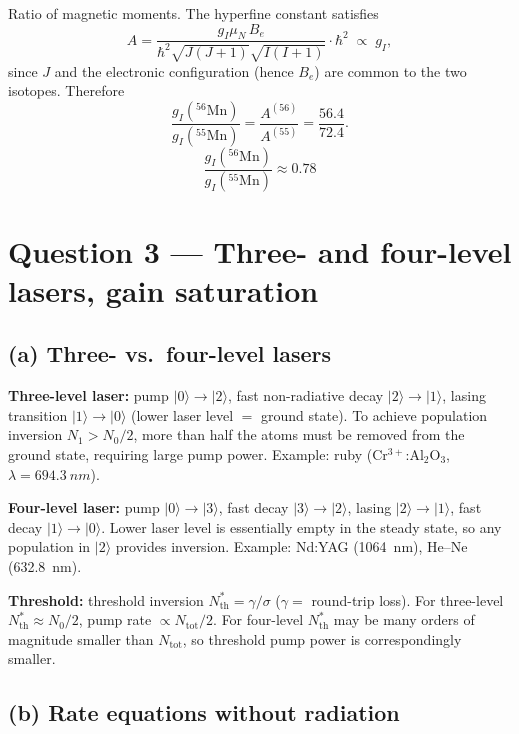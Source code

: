 \documentclass[11pt]{article}
\begin{document}
Ratio of magnetic moments. The hyperfine constant satisfies
\[
A=\frac{g_{I}\mu_{N}\,B_{e}}{\hbar^{2}\sqrt{J(J+1)}\sqrt{I(I+1)}}\cdot\hbar^{2}\;\propto\;g_{I},
\]
since $J$ and the electronic configuration (hence $B_{e}$) are common to the two isotopes. Therefore
\[
\frac{g_{I}({}^{56}\mathrm{Mn})}{g_{I}({}^{55}\mathrm{Mn})}=\frac{A^{(56)}}{A^{(55)}}=\frac{56.4}{72.4}.
\]
\[
\boxed{\;\frac{g_{I}({}^{56}\mathrm{Mn})}{g_{I}({}^{55}\mathrm{Mn})}\approx 0.78\;}
\]

\section*{Question 3 --- Three- and four-level lasers, gain saturation}

\subsection*{(a) Three- vs.\ four-level lasers}

\textbf{Three-level laser:} pump $|0\rangle\!\to\!|2\rangle$, fast non-radiative decay $|2\rangle\!\to\!|1\rangle$, lasing transition $|1\rangle\!\to\!|0\rangle$ (lower laser level $=$ ground state). To achieve population inversion $N_{1}>N_{0}/2$, more than half the atoms must be removed from the ground state, requiring large pump power. Example: ruby (Cr$^{3+}$:Al$_{2}$O$_{3}$, $\lambda=\SI{694.3}{nm}$).

\textbf{Four-level laser:} pump $|0\rangle\!\to\!|3\rangle$, fast decay $|3\rangle\!\to\!|2\rangle$, lasing $|2\rangle\!\to\!|1\rangle$, fast decay $|1\rangle\!\to\!|0\rangle$. Lower laser level is essentially empty in the steady state, so any population in $|2\rangle$ provides inversion. Example: Nd:YAG (\SI{1064}{nm}), He--Ne (\SI{632.8}{nm}).

\textbf{Threshold:} threshold inversion $N^{*}_{\mathrm{th}}=\gamma/\sigma$ ($\gamma=$ round-trip loss). For three-level $N^{*}_{\mathrm{th}}\approx N_{0}/2$, pump rate $\propto N_{\mathrm{tot}}/2$. For four-level $N^{*}_{\mathrm{th}}$ may be many orders of magnitude smaller than $N_{\mathrm{tot}}$, so threshold pump power is correspondingly smaller.

\subsection*{(b) Rate equations without radiation}
\end{document}
